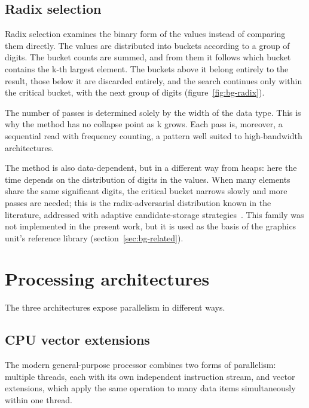 

\subsection{Radix selection}
\label{sec:bg-radix}

Radix selection examines the binary form of the values instead of comparing
them directly. The values are distributed into buckets according to a group of
digits. The bucket counts are summed, and from them it follows which bucket
contains the k-th largest element. The buckets above it belong entirely to the
result, those below it are discarded entirely, and the search continues only
within the critical bucket, with the next group of digits
(figure~\ref{fig:bg-radix}).

The number of passes is determined solely by the width of the data type. This
is why the method has no collapse point as k grows. Each pass is, moreover, a
sequential read with frequency counting, a pattern well suited to
high-bandwidth architectures.

The method is also data-dependent, but in a different way from heaps: here the
time depends on the distribution of digits in the values. When many elements
share the same significant digits, the critical bucket narrows slowly and more
passes are needed; this is the radix-adversarial distribution known in the
literature, addressed with adaptive candidate-storage
strategies~\cite{zhang2023gputopk}. This family was not implemented in the
present work, but it is used as the basis of the graphics unit's reference
library (section~\ref{sec:bg-related}).



\section{Processing architectures}
\label{sec:bg-architectures}

The three architectures expose parallelism in different ways.

\subsection{CPU vector extensions}
\label{sec:bg-arch-cpu}

The modern general-purpose processor combines two forms of parallelism:
multiple threads, each with its own independent instruction stream, and vector
extensions, which apply the same operation to many data items simultaneously
within one thread.

